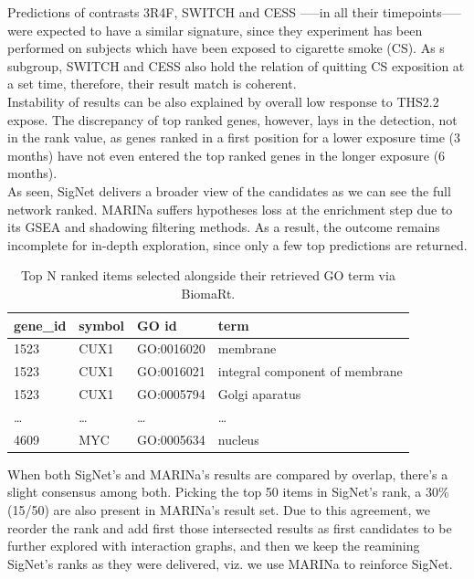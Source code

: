 Predictions of contrasts 3R4F, SWITCH and CESS —--in all their timepoints—-- were expected to have a similar signature, since they experiment has been performed on subjects which have been exposed to cigarette smoke (CS). As s subgroup, SWITCH and CESS also hold the relation of quitting CS exposition at a set time, therefore, their result match is coherent.
\\

Instability of results can be also explained by overall low response to THS2.2 expose. The discrepancy of top ranked genes, however, lays in the detection, not in the rank value, as genes ranked in a first position for a lower exposure time (3 months) have not even entered the top ranked genes in the longer exposure (6 months).
\\

As seen, SigNet delivers a broader view of the candidates as we can see the full network ranked. MARINa suffers hypotheses loss at the enrichment step due to its GSEA and shadowing filtering methods. As a result, the outcome remains incomplete for in-depth exploration, since only a few top predictions are returned.
\\

\begin{table}[h]
\centering
\begin{tabular}{|l|l|l|l|}
\hline
gene\_id & symbol & GO id      & term                           \\ \hline
1523     & CUX1   & GO:0016020 & membrane                       \\ \hline
1523     & CUX1   & GO:0016021 & integral component of membrane \\ \hline
1523     & CUX1   & GO:0005794 & Golgi aparatus                 \\ \hline
…        & …      & …          & …                              \\ \hline
4609     & MYC    & GO:0005634 & nucleus                        \\ \hline
\end{tabular}
\caption{Top N ranked items selected alongside their retrieved GO term via BiomaRt.}
\label{tbl:goterms}
\end{table}

When both SigNet's and MARINa's results are compared by overlap, there’s a slight consensus among both. Picking the top 50 items in SigNet's rank, a 30\% (15/50) are also present in MARINa’s result set. Due to this agreement, we reorder the rank and add first those intersected results as first candidates to be further explored with interaction graphs, and then we keep the reamining SigNet's ranks as they were delivered, viz. we use MARINa to reinforce SigNet.
\\

